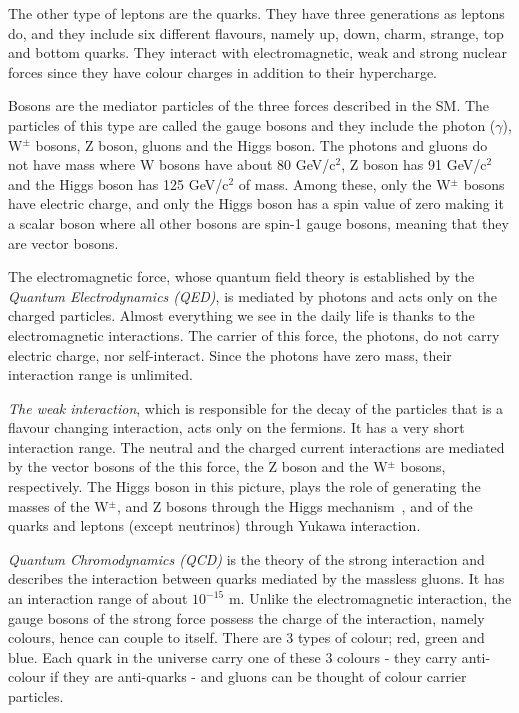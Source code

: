 The other type of leptons are the quarks. They have three generations as leptons do, and they include six different flavours, namely up, down, charm, strange, top and bottom quarks. They interact with electromagnetic, weak and strong nuclear forces since they have colour charges in addition to their hypercharge. 

Bosons are the mediator particles of the three forces described in the SM. The particles of this type are called the gauge bosons and they include the photon ($\gamma$), W$^{\pm}$ bosons, Z boson, gluons and the Higgs boson. The photons and gluons do not have mass where W bosons have about 80 GeV/c$^{2}$, Z boson has 91 GeV/c$^{2}$ and the Higgs boson has 125 GeV/c$^{2}$ of mass. Among these, only the W$^{\pm}$ bosons have electric charge, and only the Higgs boson has a spin value of zero making it a scalar boson where all other bosons are spin-1 gauge bosons, meaning that they are vector bosons.

The electromagnetic force, whose quantum field theory is established by the \emph{Quantum Electrodynamics (QED)}, is mediated by photons and acts only on the charged particles.  Almost everything we see in the daily life is thanks to the electromagnetic interactions. The carrier of this force, the photons, do not carry electric charge, nor self-interact. Since the photons have zero mass, their interaction range is unlimited.

\emph{The weak interaction}, which is responsible for the decay of the particles that is a flavour changing interaction, acts only on the fermions. It has a very short interaction range. The neutral and the charged current interactions are mediated by the vector bosons of the this force, the Z boson and the W$^{\pm}$ bosons, respectively. The Higgs boson in this picture, plays the role of generating the masses of the W$^{\pm}$, and Z bosons through the Higgs mechanism~\cite{Higgs1964, BroutEnglert, Guralnik1964}, and of the quarks and leptons (except neutrinos) through Yukawa interaction\cite{Weinberg1967}.

\emph{Quantum Chromodynamics (QCD)} is the theory of the strong interaction and describes the interaction between quarks mediated by the massless gluons. It has an interaction range of about $10^{-15}$ m. Unlike the electromagnetic interaction, the gauge bosons of the strong force possess the charge of the interaction, namely colours, hence can couple to itself. There are 3 types of colour; red, green and blue. Each quark in the universe carry one of these 3 colours - they carry anti-colour if they are anti-quarks - and gluons can be thought of colour carrier particles.

